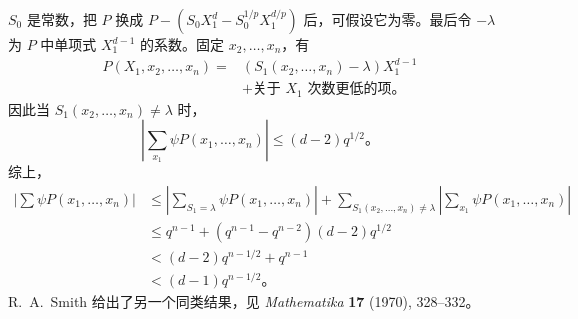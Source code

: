 $S_0$ 是常数，把 $P$ 换成
$P-(S_0X_1^d-S_0^{1/p}X_1^{d/p})$ 后，可假设它为零。最后令 $-\lambda$ 为 $P$ 中单项式 $X_1^{d-1}$ 的系数。固定 $x_2,\dots,x_n$，有
\[
\begin{aligned}
P(X_1,x_2,\dots,x_n)
={}&(S_1(x_2,\dots,x_n)-\lambda)X_1^{d-1}\\
&+\text{关于 $X_1$ 次数更低的项。}
\end{aligned}
\]
因此当 $S_1(x_2,\dots,x_n)\ne\lambda$ 时，
\[
\left|\sum_{x_1}\psi P(x_1,\dots,x_n)\right|\leqslant(d-2)q^{1/2}\text{。}
\]
综上，
\begin{align*}
\left|\sum\psi P(x_1,\dots,x_n)\right|
&\leqslant\left|\sum_{S_1=\lambda}\psi P(x_1,\dots,x_n)\right|
+\sum_{S_1(x_2,\dots,x_n)\ne\lambda}\left|\sum_{x_1}\psi P(x_1,\dots,x_n)\right|\\
&\leqslant q^{n-1}+(q^{n-1}-q^{n-2})(d-2)q^{1/2}\\
&<(d-2)q^{n-1/2}+q^{n-1}\\
&<(d-1)q^{n-1/2}\text{。}
\end{align*}
R.~A.~Smith \cite{sm70} 给出了另一个同类结果，见 \textit{Mathematika} \textbf{17} (1970), 328–332。
